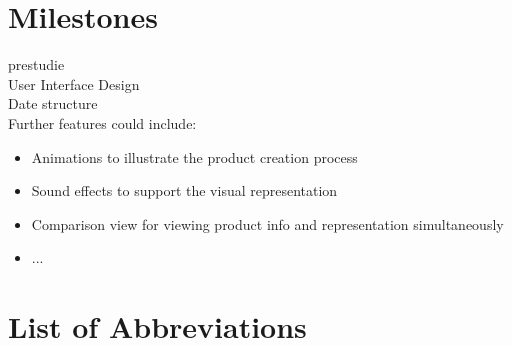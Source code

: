 \documentclass[a4page]{article}
\begin{document}
\section{Milestones}
prestudie\\
User Interface Design\\
Date structure\\

Further features could include:
\begin{itemize}
\item Animations to illustrate the product creation process
\item Sound effects to support the visual representation
\item Comparison view for viewing product info and representation simultaneously
\item ...
\end{itemize}

\newpage
\section*{List of Abbreviations}
\begin{acronym}
\end{acronym}



\end{document}

